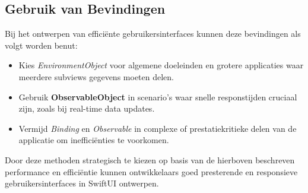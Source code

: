 \subsection{Gebruik van Bevindingen}
Bij het ontwerpen van efficiënte gebruikersinterfaces kunnen deze bevindingen als volgt worden benut:
\begin{itemize}
    \item Kies \textit{EnvironmentObject} voor algemene doeleinden en grotere applicaties waar meerdere subviews gegevens moeten delen.
    \item Gebruik \textbf{ObservableObject} in scenario's waar snelle responstijden cruciaal zijn, zoals bij real-time data updates.
    \item Vermijd \textit{Binding} en \textit{Observable} in complexe of prestatiekritieke delen van de applicatie om inefficiënties te voorkomen.
\end{itemize}

Door deze methoden strategisch te kiezen op basis van de hierboven beschreven performance en efficiëntie kunnen ontwikkelaars goed presterende en responsieve gebruikersinterfaces in SwiftUI ontwerpen.



